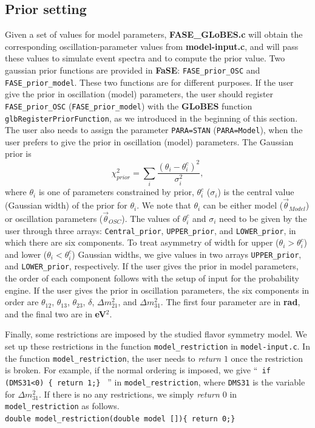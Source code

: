 \documentclass[aps,prd,nofootinbib,preprint]{revtex4}
\begin{document}
\subsection{Prior setting}\label{sec:prior}
Given a set of values for model parameters, \textbf{FASE\_GLoBES.c} will obtain the corresponding oscillation-parameter values from \textbf{model-input.c}, and will pass these values to simulate event spectra and to compute the prior value. Two gaussian prior functions are provided in \textbf{FaSE}: \texttt{FASE\_prior\_OSC} and \texttt{FASE\_prior\_model}. These two functions are for different purposes. If the user give the prior in oscillation (model) parameters, the user should register \texttt{FASE\_prior\_OSC} (\texttt{FASE\_prior\_model}) with the \textbf{GLoBES} function \texttt{glbRegisterPriorFunction}, as we introduced in the beginning of this section. The user also needs to assign the parameter \texttt{PARA=STAN} (\texttt{PARA=Model}), when the user prefers to give the prior in oscillation (model) parameters. The Gaussian prior is 
\begin{equation}\label{eq:prior}
\chi^2_{prior}=\sum_{i} \frac{(\theta_i-\theta^c_i)^2}{\sigma_i^2},
\end{equation}
 where $\theta_i$ is one of parameters constrained by prior, $\theta^c_i$ ($\sigma_i$) is the central value (Gaussian width) of the prior for $\theta_i$. We note that $\theta_i$ can be either model ($\vec{\theta}_{Model}$) or oscillation parameters ($\vec{\theta}_{OSC}$).
%
The values of $\theta^c_i$ and $\sigma_i$ need to be given by the user through three arrays: \texttt{Central\_prior}, \texttt{UPPER\_prior}, and \texttt{LOWER\_prior}, in which there are six components. To treat asymmetry of width for upper ($\theta_i>\theta_i^c$) and lower ($\theta_i<\theta_i^c$) Gaussian widths, we give values in two arrays \texttt{UPPER\_prior}, and \texttt{LOWER\_prior}, respectively. If the user gives the prior in model parameters, the order of each component follows with the setup of input for the probability engine. If the user gives the prior in oscillation parameters, the six components in order are $\theta_{12}$, $\theta_{13}$, $\theta_{23}$, $\delta$, $\Delta m_{21}^2$, and  $\Delta m_{31}^2$. The first four parameter are in \textbf{rad}, and the final two are in \textbf{eV$^2$}.

Finally, some restrictions are imposed by the studied flavor symmetry model. We set up these restrictions in the function \texttt{model\_restriction} in \texttt{model-input.c}. In the function \texttt{model\_restriction}, the user needs to \textit{return $1$} once the restriction is broken. For example, if the normal ordering is imposed, we give ``\texttt{ if (DMS31<0) \{ return 1;\} } '' in \texttt{model\_restriction}, where \texttt{DMS31} is the variable for $\Delta m_{31}^2$. If there is no any restrictions, we simply \textit{return $0$} in \texttt{model\_restriction} as follows.\vspace{0.2cm}\\
\texttt{double model\_restriction(double model [])\{ return 0;\} }\vspace{0.2cm}\\
\end{document}
